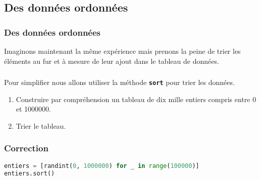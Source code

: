 \documentclass[svgnames,11pt]{beamer}
\begin{document}
\subsection{Des données ordonnées}
\begin{frame}
    \frametitle{Des données ordonnées}

    Imaginons maintenant la même expérience mais prenons la peine de trier les éléments au fur et à mesure de leur ajout dans le tableau de données.
\begin{center}
\end{center}

\end{frame}
\begin{frame}
    \frametitle{}

    \begin{activite}
        Pour simplifier nous allons utiliser la méthode \textbf{\texttt{sort}} pour trier les données.
        \begin{enumerate}
            \item Construire par compréhension un tableau de dix mille entiers compris entre 0 et 1000000.
            \item Trier le tableau.
        \end{enumerate}
        \end{activite}

\end{frame}
\begin{frame}[fragile]
    \frametitle{Correction}

    \begin{center}
    \begin{lstlisting}[language=Python , basicstyle=\small, xleftmargin=2em, xrightmargin=2em]
entiers = [randint(0, 1000000) for _ in range(100000)]
entiers.sort()
\end{lstlisting}
    \label{CODE}
    \end{center}

\end{frame}
\end{document}
